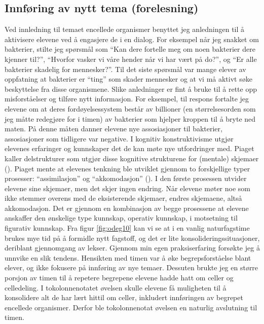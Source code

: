 \documentclass[main.tex]{subfiles}
\begin{document}
\subsection*{Innføring av nytt tema (forelesning)}
Ved innledning til temaet encellede organismer 
benyttet jeg anledningen til å aktivisere elevene ved å engasjere de i en dialog. For eksempel
når jeg snakket om bakterier, stilte jeg spørsmål som ``Kan dere fortelle meg om noen bakterier dere kjenner
til?'', ``Hvorfor vasker vi våre hender når vi har vært på do?'', og ``Er alle bakterier skadelig for mennesker?''.
Til det siste spørsmål var mange elever av oppfatning at bakterier er ``ting'' som skader mennesker og at vi
må aktivt søke beskyttelse fra disse organismene. Slike anledninger er fint å bruke til å rette opp 
misforståelser og tilføre nytt informasjon. For eksempel, til respons fortalte jeg elevene om at deres
fordøyelsessystem består av billioner (en størrelsesorden som jeg måtte redegjøre for i timen) av bakterier 
som hjelper kroppen til å bryte ned maten. På denne måten danner elevene nye assosiasjoner til bakterier,
assosiasjoner som tidligere var negative.
\newline
\newline
I kognitiv konstruktivisme utgjør elevenes erfaringer og kunnskaper det de kan møte nye 
utfordringer med. Piaget kaller delstrukturer som utgjør disse kognitive strukturene 
for (mentale) skjemaer (). Piaget mente at elevenes tenkning ble 
utviklet gjennom to forskjellige typer prosesser: ``assimilasjon'' og ``akkomodasjon'' 
(). I den første prosessen utvider elevene sine skjemaer, men
det skjer ingen endring. Når elevene møter noe som ikke stemmer overens med de
eksisterende skjemaer, endres skjemaene, altså akkomodasjon. Det er gjennom en 
kombinasjon av begge prosessene at elevene anskaffer den ønskelige type kunnskap,
operativ kunnskap, i motsetning til figurativ kunnskap.
\newline
\newline
Fra figur \ref{fig:odeg10} kan vi se at i en vanlig naturfagstime brukes mye tid på å formidle 
nytt fagstoff, og det er lite konsolideringssituasjoner, deriblant gjennomgang av lekser. Gjennom
min egen praksiserfaring forsøkte jeg å unnvike en slik tendens. Hensikten med timen var å øke begrepsforståelse 
blant elever, og ikke fokusere på innføring av nye temaer. Dessuten brukte jeg en større porsjon 
av timen til å repetere begrepene elevene hadde hatt om celler og celledeling. I
tokolonnenotatet øvelsen skulle elevene få muligheten til å konsolidere alt de har lært hittil
om celler, inkludert innføringen av begrepet encellede organismer. Derfor ble tokolonnenotat 
øvelsen en naturlig avslutning til timen.
\end{document}
